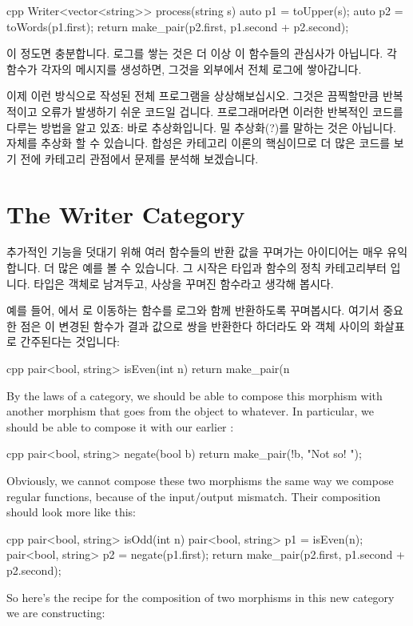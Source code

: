 \begin{snip}{cpp}
Writer<vector<string>> process(string s) {
    auto p1 = toUpper(s);
    auto p2 = toWords(p1.first);
    return make_pair(p2.first, p1.second + p2.second);
}
\end{snip}
이 정도면 충분합니다. 로그를 쌓는 것은 더 이상 이 함수들의 관심사가 아닙니다. 각 함수가 각자의
메시지를 생성하면, 그것을 외부에서 전체 로그에 쌓아갑니다.

이제 이런 방식으로 작성된 전체 프로그램을 상상해보십시오. 그것은 끔찍할만큼 반복적이고 오류가
발생하기 쉬운 코드일 겁니다. 프로그래머라면 이러한 반복적인 코드를 다루는 방법을 알고 있죠:
바로 추상화입니다. 밀 추상화(?)를 말하는 것은 아닙니다.  자체를 추상화
할 수 있습니다. 합성은 카테고리 이론의 핵심이므로 더 많은 코드를 보기 전에 카테고리 관점에서
문제를 분석해 보겠습니다.

\section{The Writer Category}

추가적인 기능을 덧대기 위해 여러 함수들의 반환 값을 꾸며가는 아이디어는 매우 유익합니다. 
더 많은 예를 볼 수 있습니다. 그 시작은 타입과 함수의 정칙 카테고리부터 입니다. 타입은
객체로 남겨두고, 사상을 꾸며진 함수라고 생각해 봅시다.

예를 들어, 에서 로 이동하는  함수를 로그와
함께 반환하도록 꾸며봅시다. 여기서 중요한 점은 이 변경된 함수가 결과 값으로 쌍을 반환한다
하더라도 와  객체 사이의 화살표로 간주된다는 것입니다:

\begin{snip}{cpp}
pair<bool, string> isEven(int n) {
    return make_pair(n %
}
\end{snip}
By the laws of a category, we should be able to compose this morphism
with another morphism that goes from the object  to
whatever. In particular, we should be able to compose it with our
earlier :

\begin{snip}{cpp}
pair<bool, string> negate(bool b) {
    return make_pair(!b, "Not so! ");
}
\end{snip}
Obviously, we cannot compose these two morphisms the same way we compose
regular functions, because of the input/output mismatch. Their
composition should look more like this:

\begin{snip}{cpp}
pair<bool, string> isOdd(int n) {
    pair<bool, string> p1 = isEven(n);
    pair<bool, string> p2 = negate(p1.first);
    return make_pair(p2.first, p1.second + p2.second);
}
\end{snip}
So here's the recipe for the composition of two morphisms in this new
category we are constructing:

